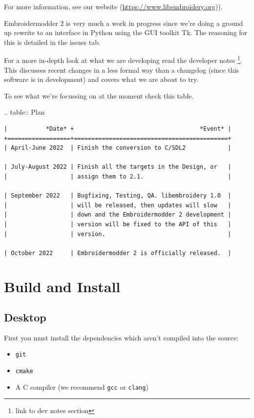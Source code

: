 \documentclass[a4paper]{report}
\begin{document}
For more information, see our website (\url{https://www.libembroidery.org})).

Embroidermodder 2 is very much a work in progress since we're doing a ground up
rewrite to an interface in Python using the GUI toolkit Tk. The reasoning for
this is detailed in the issues tab.

For a more in-depth look at what we are developing read the developer notes
\footnote{link to dev notes section}. This discusses recent changes in a less
formal way than a changelog (since this software is in development) and covers
what we are about to try.

To see what we're focussing on at the moment check this table.

.. table:: Plan

\begin{lstlisting}
|           *Date* +                                    *Event* |
+==================+============================================+
| April-June 2022  | Finish the conversion to C/SDL2            |

| July-August 2022 | Finish all the targets in the Design, or   |
|                  | assign them to 2.1.                        |

| September 2022   | Bugfixing, Testing, QA. libembroidery 1.0  |
|                  | will be released, then updates will slow   |
|                  | down and the Embroidermodder 2 development |
|                  | version will be fixed to the API of this   |
|                  | version.                                   |

| October 2022     | Embroidermodder 2 is officially released.  |
\end{lstlisting}

\section{Build and Install}

\subsection{Desktop}

First you must install the dependencies which aren't compiled into the source:

\begin{itemize}
\item \texttt{git}
\item \texttt{cmake}
\item A C compiler (we recommend \texttt{gcc} or \texttt{clang})
\end{itemize}
\end{document}
